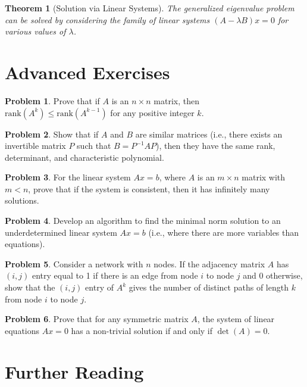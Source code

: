 \documentclass[12pt,a4paper]{article}
\theoremstyle{plain}
\newtheorem{theorem}{Theorem}[section]
\theoremstyle{definition}
\newtheorem{problem}{Problem}[section]
\begin{document}
\begin{theorem}[Solution via Linear Systems]
The generalized eigenvalue problem can be solved by considering the family of linear systems $(A - \lambda B)x = 0$ for various values of $\lambda$.
\end{theorem}

\section{Advanced Exercises}

\begin{problem}
Prove that if $A$ is an $n \times n$ matrix, then $\text{rank}(A^k) \leq \text{rank}(A^{k-1})$ for any positive integer $k$.
\end{problem}

\begin{problem}
Show that if $A$ and $B$ are similar matrices (i.e., there exists an invertible matrix $P$ such that $B = P^{-1}AP$), then they have the same rank, determinant, and characteristic polynomial.
\end{problem}

\begin{problem}
For the linear system $Ax = b$, where $A$ is an $m \times n$ matrix with $m < n$, prove that if the system is consistent, then it has infinitely many solutions.
\end{problem}

\begin{problem}
Develop an algorithm to find the minimal norm solution to an underdetermined linear system $Ax = b$ (i.e., where there are more variables than equations).
\end{problem}

\begin{problem}
Consider a network with $n$ nodes. If the adjacency matrix $A$ has $(i,j)$ entry equal to 1 if there is an edge from node $i$ to node $j$ and 0 otherwise, show that the $(i,j)$ entry of $A^k$ gives the number of distinct paths of length $k$ from node $i$ to node $j$.
\end{problem}

\begin{problem}
Prove that for any symmetric matrix $A$, the system of linear equations $Ax = 0$ has a non-trivial solution if and only if $\det(A) = 0$.
\end{problem}

\section{Further Reading}
\end{document}

